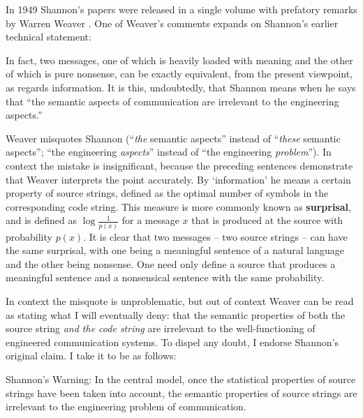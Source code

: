 \documentclass[12pt]{article}
\begin{document}
In 1949 Shannon's papers were released in a single volume with prefatory remarks by Warren Weaver \citep{shannon1949mathematical}.
One of Weaver's comments expands on Shannon's earlier technical statement:

\begin{myquote}
In fact, two messages, one of which is heavily loaded with meaning and the other of which is pure nonsense, can be exactly equivalent, from the present viewpoint, as regards information. It is this, undoubtedly, that Shannon means when he says that ``the semantic aspects of communication are irrelevant to the engineering aspects.''
\par\hspace*{\fill}\citet[8]{shannon1949mathematical}
\end{myquote}

\noindent Weaver misquotes Shannon (``\emph{the} semantic aspects'' instead of ``\emph{these} semantic aspects''; ``the engineering \textit{aspects}'' instead of ``the engineering \textit{problem}'').
In context the mistake is insignificant, because the preceding sentences demonstrate that Weaver interprets the point accurately.
By `information' he means a certain property of source strings, defined as the optimal number of symbols in the corresponding code string.
This measure is more commonly known as \textbf{surprisal}, and is defined as $\log{\frac{1}{p(x)}}$ for a message $x$ that is produced at the source with probability $p(x)$.
It is clear that two messages -- two source strings -- can have the same surprisal, with one being a meaningful sentence of a natural language and the other being nonsense.
One need only define a source that produces a meaningful sentence and a nonsensical sentence with the same probability.

In context the misquote is unproblematic, but out of context Weaver can be read as stating what I will eventually deny: that the semantic properties of both the source string \textit{and the code string} are irrelevant to the well-functioning of engineered communication systems.
To dispel any doubt, I endorse Shannon's original claim.
I take it to be as follows:

\begin{myquote}
{\sc Shannon's Warning}: In the central model, once the statistical properties of source strings have been taken into account, the semantic properties of source strings are irrelevant to the engineering problem of communication.
\end{myquote}
\end{document}
